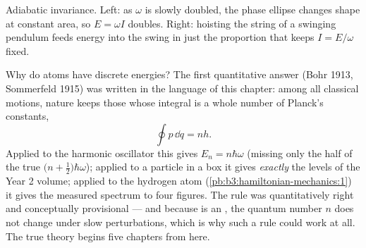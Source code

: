 \begin{omfigure}

{\small Adiabatic invariance. Left: as $\omega$ is slowly doubled, the
phase ellipse changes shape at constant area, so $E = \omega I$
doubles. Right: hoisting the string of a swinging pendulum feeds
energy into the swing in just the proportion that keeps
$I = E/\omega$ fixed.}
\end{omfigure}

\begin{remark}\label{rem:b3:hamiltonian-mechanics:old-quantum}
Why do atoms have discrete energies? The first quantitative answer
(Bohr 1913, Sommerfeld 1915) was written in the language of this
chapter: among all classical motions, nature keeps those whose 
integral is a whole number of Planck's constants,
\[
\oint p\,\dd q = nh .
\]
Applied to the harmonic oscillator this gives $E_n = n\hbar\omega$
(missing only the half of the true $\big(n + \tfrac12\big)\hbar
\omega$); applied to a particle in a box it gives \emph{exactly} the
levels of the Year 2 volume; applied to the hydrogen atom
(\cref{pb:b3:hamiltonian-mechanics:1}) it gives the measured spectrum
to four figures. The rule was quantitatively right and conceptually
provisional --- and because  is an , the
quantum number $n$ does not change under slow perturbations, which is
why such a rule could work at all. The true theory begins five
chapters from here.
\end{remark}

